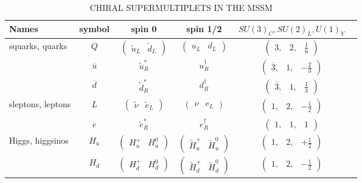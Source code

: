 \begin{table}[htpb]
  \begin{center}
    \caption{CHIRAL SUPERMULTIPLETS IN THE MSSM}
    \label{tab:chiralsuper}
    \begin{tabular}{lccccc}
      \toprule
      Names & symbol & spin 0 & spin 1/2 & $SU(3)_{C}, SU(2)_{L}, U(1)_{Y}$ \\
      \midrule
      squarks, quarks & $Q$ & $\begin{pmatrix}\tilde{u}_{L} & \tilde{d}_{L}\end{pmatrix}$ & $\begin{pmatrix}u_{L} & d_{L}\end{pmatrix}$ & $\begin{pmatrix}3, & 2, & \frac{1}{6}\end{pmatrix}$ \\
                      & $\overline{u}$ & $\tilde{u}_{R}^{*}$  & $u_{R}^{\dagger}$ & $\begin{pmatrix}\overline{3}, & 1, & -\frac{2}{3}\end{pmatrix}$ \\
                      & $\overline{d}$ & $\tilde{d}_{R}^{*}$  & $d_{R}^{\dagger}$ & $\begin{pmatrix}\overline{3}, & 1, & \frac{1}{3}\end{pmatrix}$ \\
      \midrule
      sleptons, leptons & $L$ & $\begin{pmatrix}\tilde{\nu} & \tilde{e}_{L}\end{pmatrix}$ & $\begin{pmatrix}\nu & e_{L}\end{pmatrix}$ & $\begin{pmatrix}1, & 2, & -\frac{1}{2}\end{pmatrix}$ \\
                      & $\overline{e}$ & $\tilde{e}_{R}^{*}$  & $e_{R}^{\dagger}$ & $\begin{pmatrix}1, & 1, & 1\end{pmatrix}$ \\
      \midrule
      Higgs, higgsinos & $H_{u}$ & $\begin{pmatrix}H_{u}^{+} & H_{u}^{0}\end{pmatrix}$ & $\begin{pmatrix}\tilde{H}_{u}^{+} & \tilde{H}_{u}^{0}\end{pmatrix}$ & $\begin{pmatrix}1, & 2, & +\frac{1}{2}\end{pmatrix}$ \\
                       & $H_{d}$ & $\begin{pmatrix}H_{d}^{+} & H_{d}^{0}\end{pmatrix}$ & $\begin{pmatrix}\tilde{H}_{d}^{+} & \tilde{H}_{d}^{0}\end{pmatrix}$ & $\begin{pmatrix}1, & 2, & -\frac{1}{2}\end{pmatrix}$ \\
      \bottomrule
    \end{tabular}
  \end{center}
\end{table}
